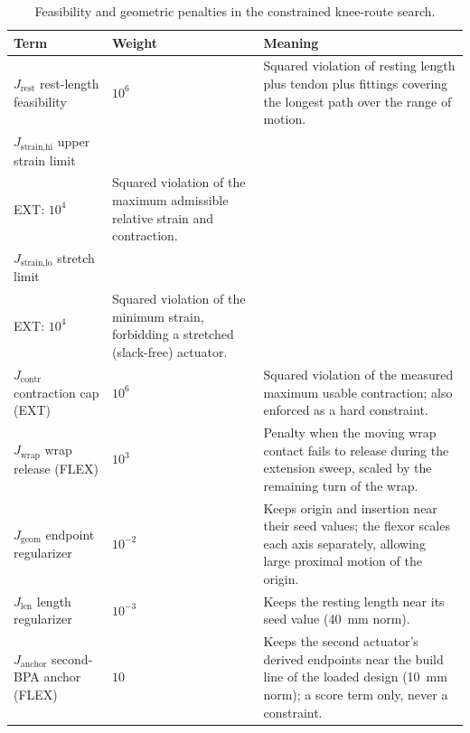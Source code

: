 \begin{table}[htbp]
\caption{Feasibility and geometric penalties in the constrained knee-route search.}\label{tab:mesh_geometry_penalties}
\small\singlespacing
\begin{tabularx}{\textwidth}{@{}p{}p{}X@{}}
\toprule
\textbf{Term} & \textbf{Weight} & \textbf{Meaning} \\
\midrule
$J_{\text{rest}}$ rest-length feasibility & $10^{6}$ & Squared violation of resting length plus tendon plus fittings covering the longest path over the range of motion. \\
$J_{\text{strain,hi}}$ upper strain limit & \shortstack[l]{FLEX: $10^{7}$\\EXT: $10^{4}$} & Squared violation of the maximum admissible relative strain and contraction. \\
$J_{\text{strain,lo}}$ stretch limit & \shortstack[l]{FLEX: $10^{7}$\\EXT: $10^{4}$} & Squared violation of the minimum strain, forbidding a stretched (slack-free) actuator. \\
$J_{\text{contr}}$ contraction cap (EXT) & $10^{6}$ & Squared violation of the measured maximum usable contraction; also enforced as a hard constraint. \\
$J_{\text{wrap}}$ wrap release (FLEX) & $10^{3}$ & Penalty when the moving wrap contact fails to release during the extension sweep, scaled by the remaining turn of the wrap. \\
$J_{\text{geom}}$ endpoint regularizer & $10^{-2}$ & Keeps origin and insertion near their seed values; the flexor scales each axis separately, allowing large proximal motion of the origin. \\
$J_{\text{len}}$ length regularizer & $10^{-3}$ & Keeps the resting length near its seed value (\qty{40}{\mm} norm). \\
$J_{\text{anchor}}$ second-BPA anchor (FLEX) & $10$ & Keeps the second actuator's derived endpoints near the build line of the loaded design (\qty{10}{\mm} norm); a score term only, never a constraint. \\
\bottomrule
\end{tabularx}
\end{table}

